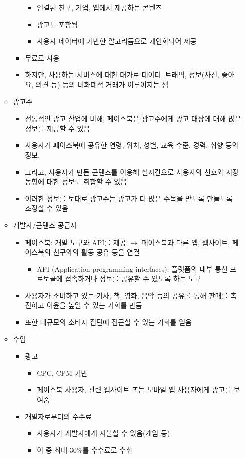 \begin{itemize}
\begin{itemize}
\begin{itemize}
\begin{itemize}
			\item 연결된 친구, 기업, 앱에서 제공하는 콘텐츠
			\item 광고도 포함됨
			\item 사용자 데이터에 기반한 알고리듬으로 개인화되어 제공
			\end{itemize}
		\item 무료로 사용
		\item 하지만, 사용하는 서비스에 대한 대가로 데이터, 트래픽, 정보(사진, 좋아요, 의견 등) 등의 비화폐적 거래가 이루어지는 셈
		\end{itemize}
	\item 광고주
		\begin{itemize}
		\item 전통적인 광고 산업에 비해, 페이스북은 광고주에게 광고 대상에 대해 많은 정보를 제공할 수 있음
		\item 사용자가 페이스북에 공유한 연령, 위치, 성별, 교육 수준, 경력, 취향 등의 정보, 
		\item 그리고, 사용자가 만든 콘텐츠를 이용해 실시간으로 사용자의 선호와 시장 동향에 대한 정보도 취합할 수 있음
		\item 이러한 정보를 토대로 광고주는 광고가 더 많은 주목을 받도록 만들도록 조정할 수 있음
		\end{itemize}
	\item 개발자/콘텐츠 공급자
		\begin{itemize}
		\item 페이스북: 개발 도구와 API를 제공 $\rightarrow$ 페이스북과 다른 앱, 웹사이트, 페이스북의 친구와의 활동 공유 등을 연결
			\begin{itemize}
			\item API (Application programming interfaces): 플랫폼의 내부 통신 프로토콜에 접속하거나 정보를 공유할 수 있도록 하는 도구
			\end{itemize}
		\item 사용자가 소비하고 있는 기사, 책, 영화, 음악 등의 공유롤 통해 판매를 촉진하고 이윤을 높일 수 있는 기회를 만듬
		\item 또한 대규모의 소비자 집단에 접근할 수 있는 기회를 얻음
		\end{itemize}
	\item 수입
		\begin{itemize}
		\item 광고
			\begin{itemize}
			\item CPC, CPM 기반
			\item 페이스북 사용자, 관련 웹사이트 또는 모바일 앱 사용자에게 광고를 보여줌
			\end{itemize}
		\item 개발자로부터의 수수료
			\begin{itemize}
			\item 사용자가 개발자에게 지불할 수 있음(게임 등)
			\item 이 중 최대 30\%를 수수료로 수취
			\end{itemize}
		\end{itemize}	
	\end{itemize}
\end{itemize}

